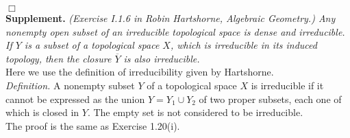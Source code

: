 \documentclass{article}
\begin{document}
$\Box$ \\


\textbf{Supplement.}
\emph{(Exercise I.1.6 in Robin Hartshorne, Algebraic Geometry.)
Any nonempty open subset of an irreducible topological space is dense and irreducible.
If $Y$ is a subset of a topological space $X$, which is irreducible in its induced topology,
then the closure $\overline{Y}$ is also irreducible.} \\

Here we use the definition of irreducibility given by Hartshorne. \\

\emph{Definition.}
A nonempty subset $Y$ of a topological space $X$ is irreducible
if it cannot be expressed as the union $Y = Y_1 \cup Y_2$ of two proper subsets,
each one of which is closed in $Y$. The empty set is not considered to be irreducible. \\

The proof is the same as Exercise 1.20(i). \\\\



\end{document}
